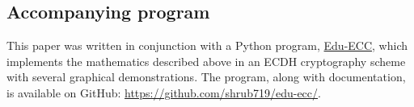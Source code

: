 \documentclass[a4paper]{article}
\begin{document}
\subsection{Accompanying program}

This paper was written in conjunction with a Python program, \href{https://github.com/shrub719/edu-ecc/}{Edu-ECC}, which implements the mathematics described above in an ECDH cryptography scheme with several graphical demonstrations. The program, along with documentation, is available on GitHub: \url{https://github.com/shrub719/edu-ecc/}.


\newpage


\end{document}
